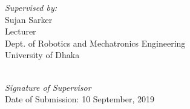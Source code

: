 \begin{titlepage}
\begin{minipage}{0.4\textwidth}
            
        \end{minipage}
        \begin{minipage}{0.4\textwidth}
            \begin{flushright} \large
                \emph{Supervised by:} \\
                Sujan Sarker\\
                Lecturer\\
                Dept. of Robotics and Mechatronics Engineering\\
                University of Dhaka %
            \end{flushright}
        \end{minipage}\\[1cm]
        \vfill        
		\emph{Signature of Supervisor}\\
		\vfill
		{\large Date of Submission: 10 September, 2019}\\[1cm] %
		\vfill %
		
	\end{titlepage}